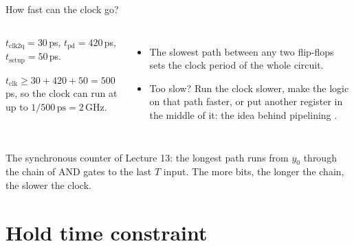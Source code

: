 \documentclass[10pt]{wosm-slides}
\begin{document}
\begin{frame}{How fast can the clock go?}
  \begin{columns}[T, totalwidth=\textwidth]
      \begin{example}
        $t_{\mathrm{clk2q}} = 30$\,ps, $t_{\mathrm{pd}} = 420$\,ps,
        $t_{\mathrm{setup}} = 50$\,ps.\par\smallskip
        $t_{\mathrm{clk}} \ge 30 + 420 + 50 = 500$\,ps, so the clock can run at
        up to $1 / 500\,\mathrm{ps} = 2$\,GHz.
      \end{example}
      \begin{itemize}
        \item The slowest path between any two flip-flops sets the clock period of
          the whole circuit.
        \item Too slow? Run the clock slower, make the logic on that path faster,
          or put another register in the middle of it: the idea behind pipelining
          .
      \end{itemize}
  \end{columns}

  \begin{remark}
    The synchronous counter of Lecture 13: the longest path runs from $y_0$
    through the chain of AND gates to the last $T$ input. The more bits, the
    longer the chain, the slower the clock.
  \end{remark}
\end{frame}

\section{Hold time constraint}
\end{document}
